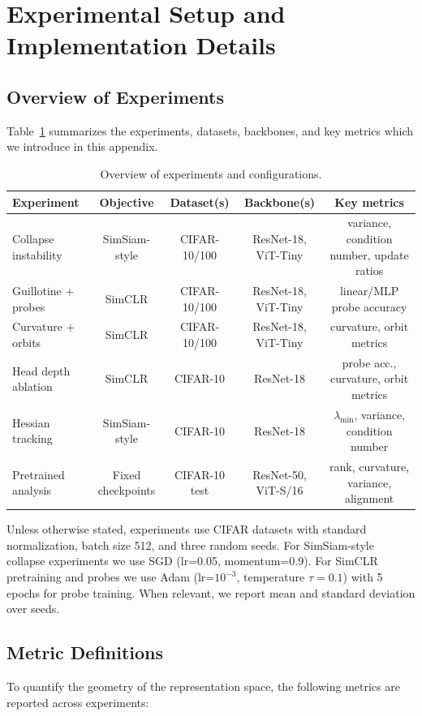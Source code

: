 \documentclass{article}
\theoremstyle{plain}
\theoremstyle{definition}
\theoremstyle{remark}
\begin{document}
\section{Experimental Setup and Implementation Details}
\label{app:exp-details}

\subsection{Overview of Experiments}
Table~\ref{tab:exp-overview} summarizes the experiments, datasets, backbones, and key metrics which we introduce in this appendix.

\begin{table}[h]
\centering
\small
\caption{Overview of experiments and configurations.}
\label{tab:exp-overview}
\begin{tabular}{lcccc}
\toprule
Experiment & Objective & Dataset(s) & Backbone(s) & Key metrics \\
\midrule
Collapse instability & SimSiam-style & CIFAR-10/100 & ResNet-18, ViT-Tiny & variance, condition number, update ratios \\
Guillotine + probes & SimCLR & CIFAR-10/100 & ResNet-18, ViT-Tiny & linear/MLP probe accuracy \\
Curvature + orbits & SimCLR & CIFAR-10/100 & ResNet-18, ViT-Tiny & curvature, orbit metrics \\
Head depth ablation & SimCLR & CIFAR-10 & ResNet-18 & probe acc., curvature, orbit metrics \\
Hessian tracking & SimSiam-style & CIFAR-10 & ResNet-18 & $\lambda_{\min}$, variance, condition number \\
Pretrained analysis & Fixed checkpoints & CIFAR-10 test & ResNet-50, ViT-S/16 & rank, curvature, variance, alignment \\
\bottomrule
\end{tabular}
\end{table}

Unless otherwise stated, experiments use CIFAR datasets with standard normalization, batch size 512, and three random seeds. For SimSiam-style collapse experiments we use SGD (lr=0.05, momentum=0.9). For SimCLR pretraining and probes we use Adam (lr=$10^{-3}$, temperature $\tau=0.1$) with 5 epochs for probe training. When relevant, we report mean and standard deviation over seeds.

\subsection{Metric Definitions}
To quantify the geometry of the representation space, the following metrics are reported across experiments:
\end{document}
